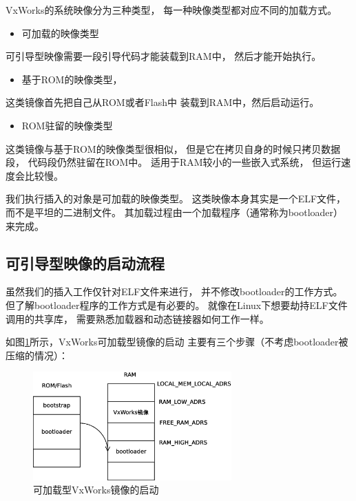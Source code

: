 VxWorks的系统映像分为三种类型，
每一种映像类型都对应不同的加载方式。

\begin{itemize}
  \item 可加载的映像类型
\end{itemize}

可引导型映像需要一段引导代码才能装载到RAM中，
然后才能开始执行。


\begin{itemize}
  \item 基于ROM的映像类型，
\end{itemize}

这类镜像首先把自己从ROM或者Flash中
装载到RAM中，然后启动运行。

\begin{itemize}
  \item ROM驻留的映像类型
\end{itemize}

这类镜像与基于ROM的映像类型很相似，
但是它在拷贝自身的时候只拷贝数据段，
代码段仍然驻留在ROM中。
适用于RAM较小的一些嵌入式系统，
但运行速度会比较慢。

我们执行插入的对象是可加载的映像类型。
这类映像本身其实是一个ELF文件，
而不是平坦的二进制文件。
其加载过程由一个加载程序（通常称为bootloader）来完成。



\subsection{可引导型映像的启动流程}

虽然我们的插入工作仅针对ELF文件来进行，
并不修改bootloader的工作方式。
但了解bootloader程序的工作方式是有必要的。
就像在Linux下想要劫持ELF文件调用的共享库，
需要熟悉加载器和动态链接器如何工作一样。

如图\ref{boot}所示，VxWorks可加载型镜像的启动
主要有三个步骤（不考虑bootloader被压缩的情况）：

\begin{figure}[h!]
    \centering
    \includegraphics[width=0.68\textwidth]{figure/boot.eps}
    \caption{可加载型VxWorks镜像的启动}
    \label{boot}
\end{figure}

